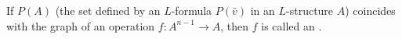 If $P(A)$ (the set defined by an $L$-formula $P(\bar{v})$ in an $L$-structure $A$) coincides with the graph of an operation $f : A^{n-1} \rightarrow A$, then $f$ is called an .

